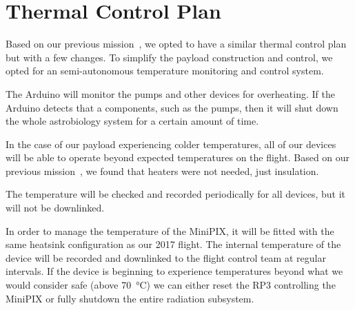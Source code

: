 \section{Thermal Control Plan}
\label{sec:TCP}
Based on our previous mission~\cite{SORA}, we opted to have a similar thermal control plan but with a few changes.  To simplify the payload construction and control, we opted for an semi-autonomous temperature monitoring and control system.  

The Arduino will monitor the pumps and other devices for overheating.  If the Arduino detects that a components, such as the pumps, then it will shut down the whole astrobiology system for a certain amount of time.

In the case of our payload experiencing colder temperatures, all of our devices will be able to operate beyond expected temperatures on the flight. Based on our previous mission~\cite{SORA}, we found that heaters were not needed, just insulation.

The temperature will be checked and recorded periodically for all devices, but it will not be downlinked.

In order to manage the temperature of the  MiniPIX, it will be fitted with the same heatsink configuration as our 2017 flight. The internal temperature of the device will be recorded and downlinked to the flight control team at regular intervals. If the device is beginning to experience temperatures beyond what we would consider safe (above \SI{70}{\celsius}) we can either reset the RP3 controlling the MiniPIX or fully shutdown the entire radiation subsystem.

